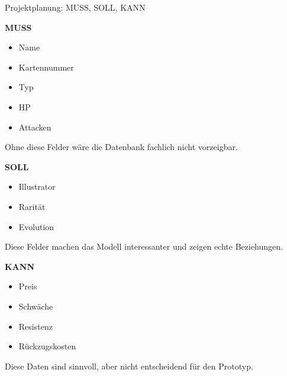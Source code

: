 \documentclass[aspectratio=169,11pt]{beamer}
\begin{document}
\begin{frame}{Projektplanung: MUSS, SOLL, KANN}
  \begin{minipage}[t]{0.32\textwidth}
    \begin{panel}[colback=softred,colframe=accent!40,height=5.8cm]
      {\Large\bfseries MUSS}\par
      \vspace{0.4em}
      \begin{itemize}
        \item Name
        \item Kartennummer
        \item Typ
        \item HP
        \item Attacken
      \end{itemize}
      \vspace{0.25em}
      \small\color{muted}Ohne diese Felder w\"are die Datenbank fachlich nicht vorzeigbar.
    \end{panel}
  \end{minipage}\hfill
  \begin{minipage}[t]{0.32\textwidth}
    \begin{panel}[colback=softblue,colframe=blue!40,height=5.8cm]
      {\Large\bfseries SOLL}\par
      \vspace{0.4em}
      \begin{itemize}
        \item Illustrator
        \item Rarit\"at
        \item Evolution
      \end{itemize}
      \vspace{0.25em}
      \small\color{muted}Diese Felder machen das Modell interessanter und zeigen echte Beziehungen.
    \end{panel}
  \end{minipage}\hfill
  \begin{minipage}[t]{0.32\textwidth}
    \begin{panel}[colback=softgold,colframe=gold!55,height=5.8cm]
      {\Large\bfseries KANN}\par
      \vspace{0.4em}
      \begin{itemize}
        \item Preis
        \item Schw\"ache
        \item Resistenz
        \item R\"uckzugskosten
      \end{itemize}
      \vspace{0.25em}
      \small\color{muted}Diese Daten sind sinnvoll, aber nicht entscheidend f\"ur den Prototyp.
    \end{panel}
  \end{minipage}
\end{frame}
\end{document}
